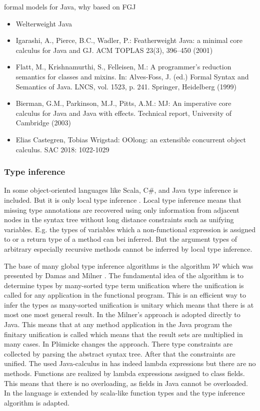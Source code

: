 
formal models for Java, why based on FGJ

\begin{itemize}
\item Welterweight Java
\item Igarashi, A., Pierce, B.C., Wadler, P.: Featherweight Java: a
  minimal core calculus for Java and GJ. ACM TOPLAS 23(3), 396–450
  (2001)
\item Flatt, M., Krishnamurthi, S., Felleisen, M.: A programmer’s
  reduction semantics for classes and mixins. In: Alves-Foss, J. (ed.)
  Formal Syntax and Semantics of Java. LNCS, vol. 1523,
  p. 241. Springer, Heidelberg (1999)
\item Bierman, G.M., Parkinson, M.J., Pitts, A.M.: MJ: An imperative
  core calculus for Java and Java with effects. Technical report,
  University of Cambridge (2003) 
\item 	Elias Castegren, Tobias Wrigstad:
OOlong: an extensible concurrent object calculus. SAC 2018: 1022-1029
\end{itemize}

\subsubsection*{Type inference}

In some object-oriented languages like Scala, C\#, and Java type inference
is included. But it is only local type inference \cite{PT98,OZZ01}. Local type
inference means that missing type annotations are recovered using only
information from adjacent nodes in the syntax tree without long distance
constraints such as unifying variables. E.g. the types of variables which
a non-functional expression is assigned to or a return type of a method can bei
inferred. But the argument types of arbitrary especially recursive methods
cannot be inferred by local type inference.

The base of many global type inference algorithms is the algorithm $\mathcal{W}$
which was presented by Damas and Milner \cite{DM82}. The fundamental idea
of the algorithm is to determine types by many-sorted type term
unification \cite{Rob65,MM82} where the unification is called for any
application in the functional program. This is an efficient way to infer the types
as many-sorted unification is unitary which means that there is at most one
most general result.  In \cite{Plue07_3} the Milner's approach is adopted
directly to Java. This means that at any method application in the Java program
the finitary unification is called which means that the result sets are multiplied in
many cases. In \cite{plue15_2} Pl\"umicke changes the approach. There 
type constraints are collected by parsing the abstract syntax tree. After that the
constraints are unified. The used Java-calculus in \cite{plue15_2} has
indeed lambda expressions but there are no methods. Functions are realized by
lambda expressions assigned to class fields. This means that there is no
overloading, as fields in Java cannot be overloaded. In \cite{plue17_2} the
language is extended by scala-like function types and the type inference
algorithm is adapted.



